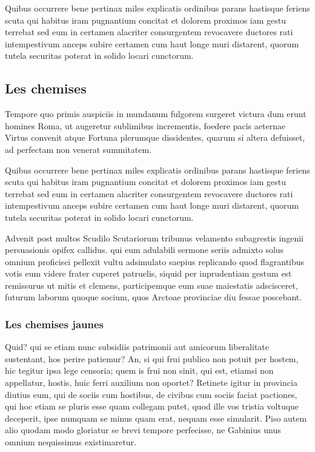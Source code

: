 \documentclass{framatexclass}
\begin{document}
Quibus occurrere bene pertinax miles explicatis ordinibus parans hastisque feriens scuta qui habitus iram pugnantium concitat et dolorem proximos iam gestu terrebat sed eum in certamen alacriter consurgentem revocavere ductores rati intempestivum anceps subire certamen cum haut longe muri distarent, quorum tutela securitas poterat in solido locari cunctorum.

\subsection{Les chemises}
Tempore quo primis auspiciis in mundanum fulgorem surgeret victura dum erunt homines Roma, ut augeretur sublimibus incrementis, foedere pacis aeternae Virtus convenit atque Fortuna plerumque dissidentes, quarum si altera defuisset, ad perfectam non venerat summitatem.



\begin{leftbarencart}

Quibus occurrere bene pertinax miles explicatis ordinibus parans hastisque feriens scuta qui habitus iram pugnantium concitat et dolorem proximos iam gestu terrebat sed eum in certamen alacriter consurgentem revocavere ductores rati intempestivum anceps subire certamen cum haut longe muri distarent, quorum tutela securitas poterat in solido locari cunctorum.
\end{leftbarencart}

Advenit post multos Scudilo Scutariorum tribunus velamento subagrestis ingenii persuasionis opifex callidus. qui eum adulabili sermone seriis admixto solus omnium proficisci pellexit vultu adsimulato saepius replicando quod flagrantibus votis eum videre frater cuperet patruelis, siquid per inprudentiam gestum est remissurus ut mitis et clemens, participemque eum suae maiestatis adscisceret, futurum laborum quoque socium, quos Arctoae provinciae diu fessae poscebant.


\subsubsection{Les chemises jaunes}
Quid? qui se etiam nunc subsidiis patrimonii aut amicorum liberalitate sustentant, hos perire patiemur? An, si qui frui publico non potuit per hostem, hic tegitur ipsa lege censoria; quem is frui non sinit, qui est, etiamsi non appellatur, hostis, huic ferri auxilium non oportet? Retinete igitur in provincia diutius eum, qui de sociis cum hostibus, de civibus cum sociis faciat pactiones, qui hoc etiam se pluris esse quam collegam putet, quod ille vos tristia voltuque deceperit, ipse numquam se minus quam erat, nequam esse simularit. Piso autem alio quodam modo gloriatur se brevi tempore perfecisse, ne Gabinius unus omnium nequissimus existimaretur.
\end{document}
